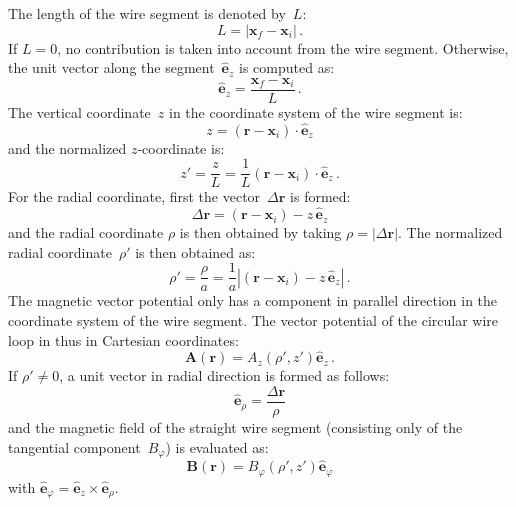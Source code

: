 The length of the wire segment is denoted by~$L$:
\begin{equation}
  L = |\mathbf{x}_f - \mathbf{x}_i| \, .
\end{equation}
If $L=0$, no contribution is taken into account from the wire segment.
Otherwise, the unit vector along the segment~$\hat{\mathbf{e}}_z$ is computed as:
\begin{equation}
  \hat{\mathbf{e}}_z = \frac{\mathbf{x}_f - \mathbf{x}_i}{L} \, .
\end{equation}
The vertical coordinate~$z$ in the coordinate system of the wire segment is:
\begin{equation}
  z = (\mathbf{r} - \mathbf{x}_i) \cdot \hat{\mathbf{e}}_z
\end{equation}
and the normalized $z$-coordinate is:
\begin{equation}
  z' = \frac{z}{L} = \frac{1}{L} (\mathbf{r} - \mathbf{x}_i) \cdot \hat{\mathbf{e}}_z \, .
\end{equation}
For the radial coordinate, first the vector~$\Delta \mathbf{r}$ is formed:
\begin{equation}
  \Delta \mathbf{r} = (\mathbf{r} - \mathbf{x}_i) - z \, \hat{\mathbf{e}}_z
\end{equation}
and the radial coordinate $\rho$ is then obtained by taking $\rho = |\Delta \mathbf{r}|$.
The normalized radial coordinate~$\rho'$ is then obtained as:
\begin{equation}
  \rho' = \frac{\rho}{a} = \frac{1}{a} |(\mathbf{r} - \mathbf{x}_i) - z \, \hat{\mathbf{e}}_z| \, .
\end{equation}
The magnetic vector potential only has a component in parallel direction in the coordinate system of the wire segment.
The vector potential of the circular wire loop in thus in Cartesian coordinates:
\begin{equation}
  \mathbf{A}(\mathbf{r}) = A_z(\rho', z') \hat{\mathbf{e}}_z \, .
\end{equation}
If $\rho' \neq 0$, a unit vector in radial direction is formed as follows:
\begin{equation}
  \hat{\mathbf{e}}_\rho = \frac{\Delta \mathbf{r}}{\rho}
\end{equation}
and the magnetic field of the straight wire segment (consisting only of the tangential component~$B_\varphi$)
is evaluated as:
\begin{equation}
  \mathbf{B}(\mathbf{r}) = B_\varphi(\rho', z') \hat{\mathbf{e}}_\varphi
\end{equation}
with $\hat{\mathbf{e}}_\varphi = \hat{\mathbf{e}}_z \times \hat{\mathbf{e}}_\rho$.

